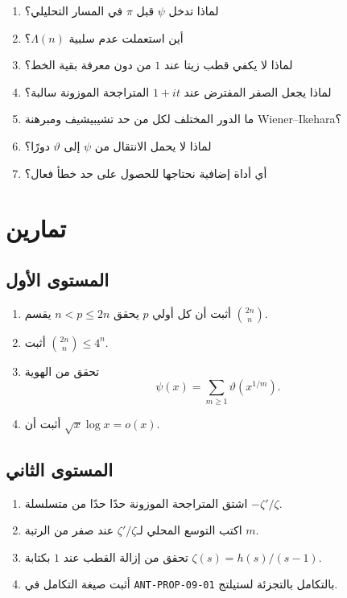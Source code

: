 \begin{enumerate}
  \item لماذا تدخل \(\psi\) قبل \(\pi\) في المسار التحليلي؟
  \item أين استعملت عدم سلبية \(\Lambda(n)\)؟
  \item لماذا لا يكفي قطب زيتا عند \(1\) من دون معرفة بقية الخط؟
  \item لماذا يجعل الصفر المفترض عند \(1+it\) المتراجحة الموزونة سالبة؟
  \item ما الدور المختلف لكل من حد تشيبيشيف ومبرهنة Wiener--Ikehara؟
  \item لماذا لا يحمل الانتقال من \(\psi\) إلى \(\vartheta\) دورًا؟
  \item أي أداة إضافية نحتاجها للحصول على حد خطأ فعال؟
\end{enumerate}

\section{تمارين}

\subsection{المستوى الأول}
\begin{enumerate}
  \item أثبت أن كل أولي \(p\) يحقق \(n<p\le2n\) يقسم
  \(\binom{2n}{n}\).
  \item أثبت \(\binom{2n}{n}\le4^n\).
  \item تحقق من الهوية
  \[
  \psi(x)=\sum_{m\ge1}\vartheta(x^{1/m}).
  \]
  \item أثبت أن \(\sqrt{x}\log x=o(x)\).
\end{enumerate}

\subsection{المستوى الثاني}
\begin{enumerate}
  \item اشتق المتراجحة الموزونة حدًا حدًا من متسلسلة
  \(-\zeta'/\zeta\).
  \item اكتب التوسع المحلي لـ\(\zeta'/\zeta\) عند صفر من الرتبة \(m\).
  \item تحقق من إزالة القطب عند \(1\) بكتابة
  \(\zeta(s)=h(s)/(s-1)\).
  \item أثبت صيغة التكامل في
  \textenglish{\texttt{ANT-PROP-09-01}} بالتكامل بالتجزئة لستيلتج.
\end{enumerate}

